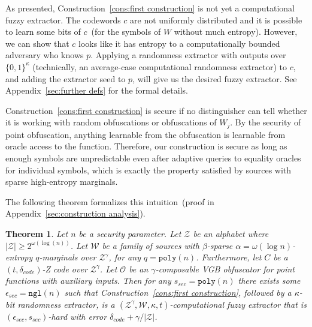 \documentclass[11pt]{article}
\newtheorem{theorem}{Theorem}[section]
\newcommand{\apref}[1]{\mbox{Appendix~\ref{#1}}}
\newcommand{\consref}[1]{\mbox{Construction~\ref{#1}}}
\newcommand{\zo}{\ensuremath{\{0, 1\}}}
\newcommand{\poly}{\ensuremath{\mathtt{poly}}\xspace}
\newcommand{\ngl}{\ensuremath{\mathtt{ngl}}\xspace}
\newcommand{\authnote}[2]{{\textcolor{red}{\textsf{#1 notes: }\textcolor{blue}{ #2}}\marginpar{\textcolor{red}{\textbf{!!!!!}}}}}
\newcommand{\authnote}[2]{}
\newcommand{\bnote}[1]{{\authnote{Ben}{#1}}}
\begin{document}

\noindent
As presented, \consref{cons:first construction} is not yet a computational fuzzy extractor.  The codewords $c$ are not uniformly distributed and it is possible to learn some bits of $c$~(for the symbols of $W$ without much entropy).  However, we can show that $c$ looks like it has entropy to a computationally bounded adversary who knows $p$. Applying a randomness extractor with outputs over $\zo^\kappa$ (technically, an average-case computational randomness extractor) to $c$, and adding the extractor seed to $p$, will give us the desired fuzzy extractor. See \apref{sec:further defs} for the formal details.

\consref{cons:first construction} is secure if no distinguisher can tell whether it is working with random obfuscations or obfuscations of $W_j$.  By the security of point obfuscation, anything learnable from the obfuscation is learnable from oracle access to the function. Therefore, our construction is secure as long as enough symbols are unpredictable even after adaptive queries to equality oracles for individual symbols, which is exactly the property satisfied by sources with sparse high-entropy marginals.

The following theorem formalizes this intuition~(proof in \apref{sec:construction analysis}).
\begin{theorem}
\label{thm:main thm first cons}
Let $n$ be a security parameter. Let $\mathcal{Z}$ be an alphabet where $|\mathcal{Z}| \ge 2^{ \omega(\log(n))}$.
Let $\mathcal{W}$ be a family of sources with $\beta$-sparse $\alpha=\omega(\log n)$-entropy $q$-marginals over $\mathcal{Z}^\gamma$, for any $q = \poly(n)$.  Furthermore, let $C$ be a $(t, \delta_{code})$-Z code over $\mathcal{Z}^\gamma$.  Let $\mathcal{O}$ be an $\gamma$-composable VGB obfuscator for point functions with auxiliary inputs. Then for any $s_{sec} = \poly(n)$ there exists some $\epsilon_{sec}=\ngl(n)$ such that \consref{cons:first construction}, followed by a $\kappa$-bit randomness extractor, is a $(\mathcal{Z}^\gamma, \mathcal{W}, \kappa, t)$-computational fuzzy extractor that is $(\epsilon_{sec}, s_{sec})$-hard with error $\delta_{code} + \gamma/|\mathcal{Z}|$.
\end{theorem}
\end{document}
